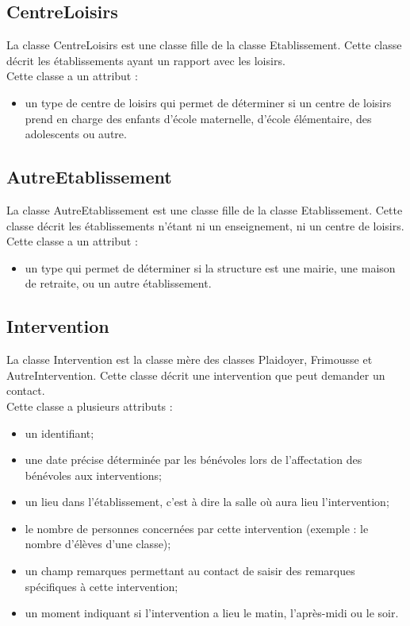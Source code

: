 \documentclass[asi, sansVersion]{picInsa}
\begin{document}
\subsection*{CentreLoisirs}
La classe CentreLoisirs est une classe fille de la classe Etablissement. Cette classe décrit les établissements ayant un rapport avec les loisirs. \\
Cette classe a un attribut : 
\begin{itemize}
\item un type de centre de loisirs qui permet de déterminer si un centre de loisirs prend en charge des enfants d'école maternelle, d'école élémentaire, des adolescents ou autre.
\end{itemize}  

\subsection*{AutreEtablissement}
La classe AutreEtablissement est une classe fille de la classe Etablissement. Cette classe décrit les établissements n'étant ni un enseignement, ni un centre de loisirs. \\
Cette classe a un attribut : 
\begin{itemize}
\item un type qui permet de déterminer si la structure est une mairie, une maison de retraite, ou un autre établissement.
\end{itemize}  

\subsection*{Intervention}
La classe Intervention est la classe mère des classes Plaidoyer, Frimousse et AutreIntervention. Cette classe décrit une intervention que peut demander un contact. \\
Cette classe a plusieurs attributs :
\begin{itemize}
\item un identifiant;
\item une date précise déterminée par les bénévoles lors de l'affectation des bénévoles aux interventions;
\item un lieu dans l'établissement, c'est à dire la salle où aura lieu l'intervention;
\item le nombre de personnes concernées par cette intervention (exemple : le nombre d'élèves d'une classe);
\item un champ remarques permettant au contact de saisir des remarques spécifiques à cette intervention;
\item un moment indiquant si l'intervention a lieu le matin, l'après-midi ou le soir.
\end{itemize}
\end{document}
